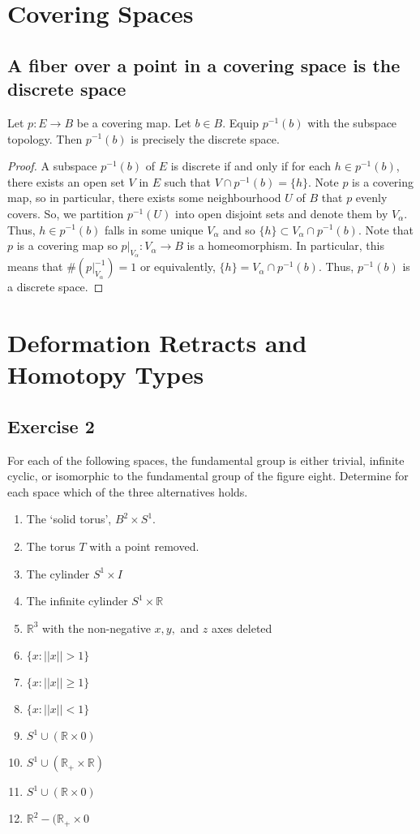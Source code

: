 \documentclass{article}
\begin{document}
\section{Covering Spaces}

\subsection*{A fiber over a point in a covering space is the discrete space}

Let $p: E\to B$ be a covering map. Let $b\in B$. Equip $p^{-1}(b)$ with the subspace topology. Then $p^{-1}(b)$ is precisely the discrete space.
\begin{proof}
	A subspace $p^{-1}(b)$ of $E$ is discrete if and only if for each $h\in p^{-1}(b)$, there exists an open set $V$ in $E$ such that $V\cap p^{-1}(b) = \{h\}$. Note $p$ is a covering
	map, so in particular, there exists some neighbourhood $U$ of $B$ that $p$ evenly covers. So, we partition $p^{-1}(U)$ into open disjoint sets and denote them by $V_{\alpha}$.
	Thus, $h\in p^{-1}(b)$ falls in some unique $V_{\alpha}$ and so $\{h\} \subset V_{\alpha} \cap p^{-1}(b)$. Note that $p$ is a covering map so $p|_{V_{\alpha}}: V_{\alpha} \to B$ 
	is a homeomorphism. In particular, this means that $\# (p|_{V_{\alpha}}^{-1})=1$ or equivalently, $\{h\} = V_{\alpha} \cap p^{-1}(b)$. Thus, $p^{-1}(b)$ is a discrete space.
\end{proof}

\section{Deformation Retracts and Homotopy Types}

\subsection*{Exercise 2}

For each of the following spaces, the fundamental group is either trivial, infinite cyclic, or isomorphic to the fundamental group of the figure eight. Determine for each
space which of the three alternatives holds.
\begin{enumerate}
	\item The `solid torus', $B^2 \times S^1$.
	\item The torus $T$ with a point removed.
	\item The cylinder $S^1 \times I$
	\item The infinite cylinder $S^1 \times \mathbb{R}$
	\item $\mathbb{R}^3$ with the non-negative $x,y,$ and $z$ axes deleted
	\item $\{x : ||x||>1 \}$
	\item $\{x: ||x||\geq 1\}$
	\item $\{x: ||x|| < 1 \}$
	\item $S^1 \cup (\mathbb{R}\times 0)$
	\item $S^1 \cup (\mathbb{R}_{+} \times \mathbb{R})$
	\item $S^1 \cup (\mathbb{R}\times 0)$
	\item $\mathbb{R}^2 - (\mathbb{R}_+ \times 0$
\end{enumerate}
\end{document}
